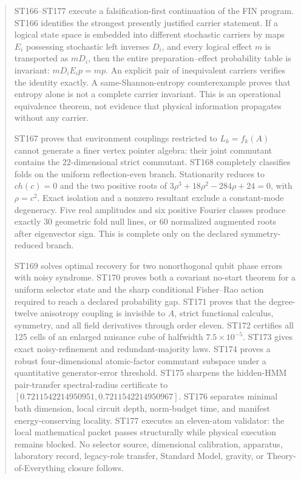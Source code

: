 \documentclass[11pt,a4paper]{article}
\begin{document}
\begin{abstract}
ST166--ST177 execute a falsification-first continuation of the FIN program. ST166 identifies the strongest presently justified carrier statement. If a logical state space is embedded into different stochastic carriers by maps $E_i$ possessing stochastic left inverses $D_i$, and every logical effect $m$ is transported as $mD_i$, then the entire preparation--effect probability table is invariant: $mD_iE_ip=mp$. An explicit pair of inequivalent carriers verifies the identity exactly. A same-Shannon-entropy counterexample proves that entropy alone is not a complete carrier invariant. This is an operational equivalence theorem, not evidence that physical information propagates without any carrier.

ST167 proves that environment couplings restricted to $L_k=f_k(A)$ cannot generate a finer vertex pointer algebra: their joint commutant contains the $22$-dimensional strict commutant. ST168 completely classifies folds on the uniform reflection-even branch. Stationarity reduces to $c h(c)=0$ and the two positive roots of $3\rho^3+18\rho^2-284\rho+24=0$, with $\rho=c^2$. Exact isolation and a nonzero resultant exclude a constant-mode degeneracy. Five real amplitudes and six positive Fourier classes produce exactly 30 geometric fold null lines, or 60 normalized augmented roots after eigenvector sign. This is complete only on the declared symmetry-reduced branch.

ST169 solves optimal recovery for two nonorthogonal qubit phase errors with noisy syndrome. ST170 proves both a covariant no-start theorem for a uniform selector state and the sharp conditional Fisher--Rao action required to reach a declared probability gap. ST171 proves that the degree-twelve anisotropy coupling is invisible to $A$, strict functional calculus, symmetry, and all field derivatives through order eleven. ST172 certifies all 125 cells of an enlarged nuisance cube of halfwidth $7.5\times10^{-5}$. ST173 gives exact noisy-refinement and redundant-majority laws. ST174 proves a robust four-dimensional atomic-factor commutant subspace under a quantitative generator-error threshold. ST175 sharpens the hidden-HMM pair-transfer spectral-radius certificate to $[0.7211542214950951,0.7211542214950967]$. ST176 separates minimal bath dimension, local circuit depth, norm-budget time, and manifest energy-conserving locality. ST177 executes an eleven-atom validator: the local mathematical packet passes structurally while physical execution remains blocked. No selector source, dimensional calibration, apparatus, laboratory record, legacy-role transfer, Standard Model, gravity, or Theory-of-Everything closure follows.
\end{abstract}
\end{document}
